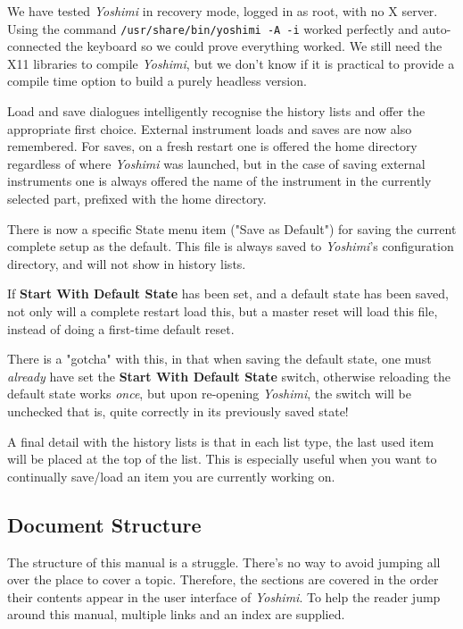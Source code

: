 \documentclass[
 11pt,
 twoside,
 a4paper,
 final                                 %
]{article}
\begin{document}
   We have tested \textsl{Yoshimi} in recovery mode, logged in as root, with
   no X server. Using the command \texttt{/usr/share/bin/yoshimi -A -i}
   worked perfectly and auto-connected the keyboard so we could prove
   everything worked.  We still need the X11 libraries to compile
   \textsl{Yoshimi}, but we don't know if it is practical to provide a compile
   time option to build a purely headless version.

   Load and save dialogues intelligently recognise the history lists and offer
   the appropriate first choice. External instrument loads and saves are now
   also remembered.
   For saves, on a fresh restart one is offered the home directory regardless
   of where \textsl{Yoshimi} was launched, but in the case of saving
   external instruments one is always offered the name of the instrument
   in the currently selected part, prefixed with the home directory.

   There is now a specific State menu item ("Save as Default") for saving
   the current complete setup as the default. This file is always saved to
   \textsl{Yoshimi}'s configuration directory,
   and will not show in history lists.

   If \textbf{Start With Default State} has been set, and a
   default state has been saved, not only will a complete restart load this,
   but a master reset will load this file, instead of doing a
   first-time default reset.

   There is a "gotcha" with this, in that when saving the default state,
   one must \textsl{already} have set the \textbf{Start With Default State}
   switch, otherwise reloading
   the default state works \textsl{once}, but upon re-opening
   \textsl{Yoshimi}, the switch will be
   unchecked \textemdash that is, quite correctly in its previously saved state!

   A final detail with the history lists is that in each list type, the last
   used item will be placed at the top of the list. This is especially useful
   when you want to continually save/load an item you are currently working on.

\subsection{Document Structure}
\label{subsec:introduction_document_structure}

   The structure of this manual is a struggle.
   There's no way to avoid jumping all over the place to
   cover a topic.  Therefore, the sections are covered
   in the order their contents appear in the user interface of
   \textsl{Yoshimi}.  To help the reader jump around this manual, multiple
   links and an index are supplied.
\end{document}
